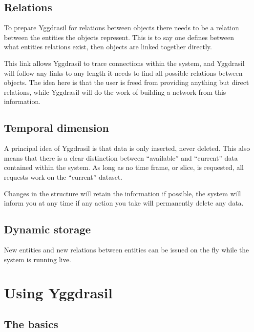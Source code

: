 \documentclass[english,a4paper]{article}
\begin{document}
\subsection{Relations}

To prepare Yggdrasil for relations between objects there needs to be a
relation between the entities the objects represent.  This is to say
one defines between what entities relations exist, then objects are
linked together directly.  

This link allows Yggdrasil to trace connections within the system, and
Yggdrasil will follow any links to any length it needs to find all
possible relations between objects.  The idea here is that the user is
freed from providing anything but direct relations, while Yggdrasil
will do the work of building a network from this information.
 
\subsection{Temporal dimension}

A principal idea of Yggdrasil is that data is only inserted, never
deleted.  This also means that there is a clear distinction between
``available'' and ``current'' data contained within the system.
As long as no time frame, or slice, is requested, all requests work on
the ``current'' dataset. 


Changes in the structure will retain the information if possible, the
system will inform you at any time if any action you take will
permanently delete any data.

\subsection{Dynamic storage}

New entities and new relations between entities can be issued on the
fly while the system is running live.  

\section{Using Yggdrasil}

\subsection{The basics}
\end{document}
